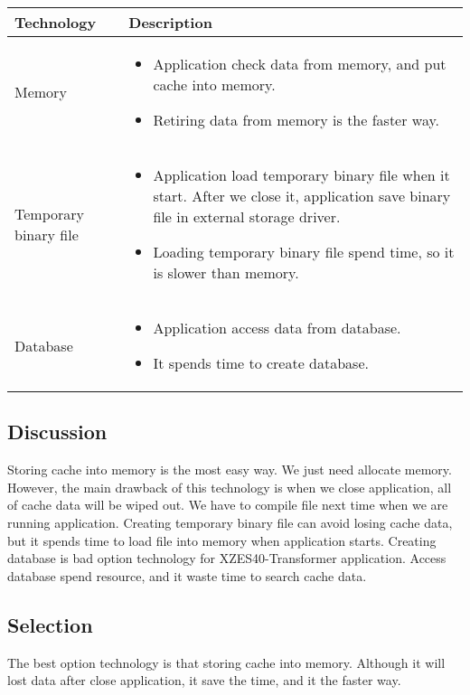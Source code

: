 \begin{center}
    \begin{tabular}{ | l | p{10cm} |}
    \hline
    Technology & Description  \\ \hline
    Memory&
    \begin{itemize}
      \item Application check data from memory, and put cache into memory.
	  \item Retiring data from memory is the faster way.
    \end{itemize}\\ \hline
    Temporary binary file&
    \begin{itemize}
      \item Application load temporary binary file when it start. After we close it, application save binary file in external storage driver.
	  \item Loading temporary binary file spend time, so it is slower than memory.
    \end{itemize}\\ \hline
    Database \cite{foundation_intro}&
    \begin{itemize}
      \item Application access data from database.
	  \item It spends time to create database. 
    \end{itemize}\\ \hline
    \end{tabular}
\end{center}

\subsection{Discussion}
Storing cache into memory is the most easy way. We just need allocate memory. However, the main drawback of this technology is when we close application, all of cache data will be wiped out. We have to compile file next time when we are running application. Creating temporary binary file can avoid losing cache data, but it spends time to load file into memory when application starts. Creating database is bad option technology for XZES40-Transformer application. Access database spend resource, and it waste time to search cache data.

\subsection{Selection}
The best option technology is that storing cache into memory. Although it will lost data after close application, it save the time, and it the faster way.